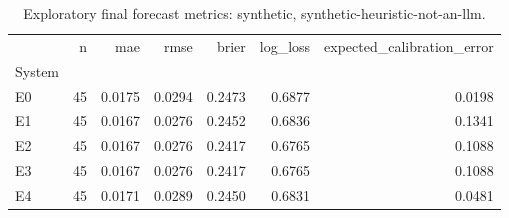 \begin{table}
\caption{Exploratory final forecast metrics: synthetic, synthetic-heuristic-not-an-llm.}
\label{tab:investiq-forecast}
\begin{tabular}{lrrrrrr}
\toprule
 & n & mae & rmse & brier & log_loss & expected_calibration_error \\
System &  &  &  &  &  &  \\
\midrule
E0 & 45 & 0.0175 & 0.0294 & 0.2473 & 0.6877 & 0.0198 \\
E1 & 45 & 0.0167 & 0.0276 & 0.2452 & 0.6836 & 0.1341 \\
E2 & 45 & 0.0167 & 0.0276 & 0.2417 & 0.6765 & 0.1088 \\
E3 & 45 & 0.0167 & 0.0276 & 0.2417 & 0.6765 & 0.1088 \\
E4 & 45 & 0.0171 & 0.0289 & 0.2450 & 0.6831 & 0.0481 \\
\bottomrule
\end{tabular}
\end{table}
